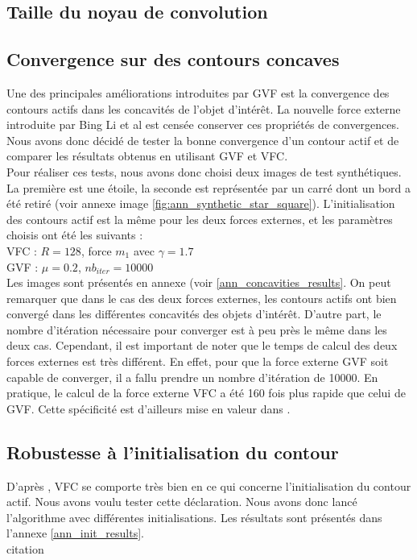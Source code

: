 \subsection{Taille du noyau de convolution}



\subsection{Convergence sur des contours concaves}
Une des principales améliorations introduites par GVF est la convergence des contours actifs dans les concavités de l'objet d'intérêt. La nouvelle force externe introduite par Bing Li et al est censée conserver ces propriétés de convergences. Nous avons donc décidé de tester la bonne convergence d'un contour actif et de comparer les résultats obtenus en utilisant GVF et VFC.\\ %

Pour réaliser ces tests, nous avons donc choisi deux images de test synthétiques. La première est une étoile, la seconde est représentée par un carré dont un bord a été retiré (voir annexe image \ref{fig:ann_synthetic_star_square}). L'initialisation des contours actif est la même pour les deux forces externes, et les paramètres choisis ont été les suivants :\\

VFC : $R = 128$, force $m_{1}$ avec $\gamma = 1.7$\\
GVF : $\mu = 0.2$, $nb_{iter} = 10000$\\

Les images sont présentés en annexe (voir \ref{ann_concavities_results}. On peut remarquer que dans le cas des deux forces externes, les contours actifs ont bien convergé dans les différentes concavités des objets d'intérêt. D'autre part, le nombre d'itération nécessaire pour converger est à peu près le même dans les deux cas. Cependant, il est important de noter que le temps de calcul des deux forces externes est très différent. En effet, pour que la force externe GVF soit capable de converger, il a fallu prendre un nombre d'itération de 10000. En pratique, le calcul de la force externe VFC a été 160 fois plus rapide que celui de GVF. Cette spécificité est d'ailleurs mise en valeur dans \cite{vfc}. 

\subsection{Robustesse à l'initialisation du contour}
D'après \cite{vfc}, VFC se comporte très bien en ce qui concerne l'initialisation du contour actif. Nous avons voulu tester cette déclaration. Nous avons donc lancé l'algorithme avec différentes initialisations. Les résultats sont présentés dans l'annexe \ref{ann_init_results}.\\ citation

